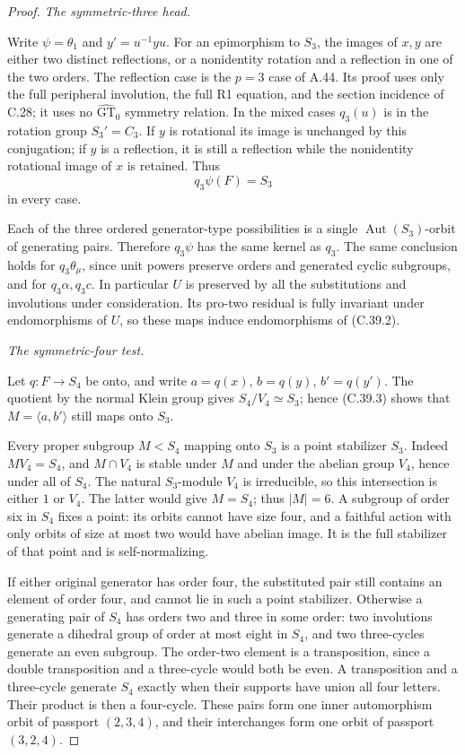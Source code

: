 \begin{proof}
\emph{The symmetric-three head.}\par
Write \(\psi=\theta_1\) and \(y'=u^{-1}yu\).
For an epimorphism to \(S_3\), the images of \(x,y\)
are either two distinct reflections, or a nonidentity rotation
and a reflection in one of the two orders. The reflection case
is the \(p=3\) case of A.44. Its proof uses only the full
peripheral involution, the full R1 equation, and the section
incidence of C.28; it uses no \(\widehat{\mathrm{GT}}_0\)
symmetry relation. In the mixed cases \(q_3(u)\) is in the
rotation group \(S_3'=C_3\). If \(y\) is rotational its
image is unchanged by this conjugation; if \(y\) is a
reflection, it is still a reflection while the nonidentity
rotational image of \(x\) is retained. Thus
\[
                              q_3\psi(F)=S_3
 \tag{C.39.3}
\]
in every case.

Each of the three ordered generator-type possibilities is a
single \(\operatorname{Aut}(S_3)\)-orbit of generating pairs.
Therefore \(q_3\psi\) has the same kernel as \(q_3\).
The same conclusion holds for \(q_3\theta_\mu\), since unit
powers preserve orders and generated cyclic subgroups, and
for \(q_3\alpha,q_3c\). In particular \(U\) is preserved
by all the substitutions and involutions under consideration.
Its pro-two residual is fully invariant under endomorphisms
of \(U\), so these maps induce endomorphisms of (C.39.2).

\emph{The symmetric-four test.}\par
Let \(q:F\to S_4\) be onto, and write
\(a=q(x)\), \(b=q(y)\), \(b'=q(y')\).
The quotient by the normal Klein group gives
\(S_4/V_4\simeq S_3\); hence (C.39.3) shows that
\(M=\langle a,b'\rangle\) still maps onto \(S_3\).

Every proper subgroup \(M<S_4\) mapping onto \(S_3\)
is a point stabilizer \(S_3\). Indeed \(MV_4=S_4\), and
\(M\cap V_4\) is stable under \(M\) and under the
abelian group \(V_4\), hence under all of \(S_4\).
The natural \(S_3\)-module \(V_4\) is irreducible, so
this intersection is either \(1\) or \(V_4\).
The latter would give \(M=S_4\); thus \(|M|=6\).
A subgroup of order six in \(S_4\) fixes a point: its
orbits cannot have size four, and a faithful action with
only orbits of size at most two would have abelian image.
It is the full stabilizer of that point and is self-normalizing.

If either original generator has order four, the substituted
pair still contains an element of order four, and cannot lie
in such a point stabilizer. Otherwise a generating pair of
\(S_4\) has orders two and three in some order: two
involutions generate a dihedral group of order at most eight
in \(S_4\), and two three-cycles generate an even subgroup.
The order-two element is a transposition, since a double
transposition and a three-cycle would both be even. A
transposition and a three-cycle generate \(S_4\) exactly
when their supports have union all four letters. Their
product is then a four-cycle. These pairs form one inner
automorphism orbit of passport \((2,3,4)\), and their
interchanges form one orbit of passport \((3,2,4)\).


\end{proof}
